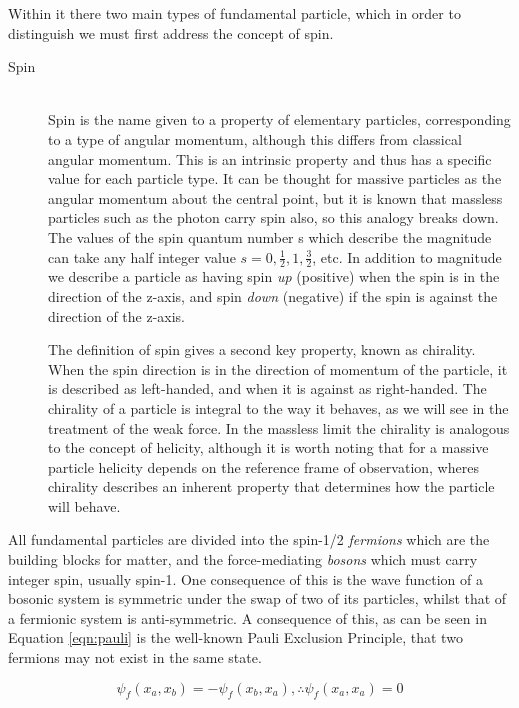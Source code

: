 Within it there two main types of fundamental particle, which in order to distinguish we must first address the concept of spin. 
\begin{description}
\item[Spin] \hfill \\
Spin is the name given to a property of elementary particles, corresponding to a type of angular momentum, although this differs from classical angular momentum. This is an intrinsic property and thus has a specific value for each particle type. It can be thought for massive particles as the angular momentum about the central point, but it is known that massless particles such as the photon carry spin also, so this analogy breaks down. The values of the spin quantum number s which describe the magnitude can take any half integer value $s=0, \frac{1}{2}, 1, \frac{3}{2}$, etc. In addition to magnitude we describe a particle as having spin \textit{up} (positive) when the spin is in the direction of the z-axis, and spin \textit{down} (negative) if the spin is against the direction of the z-axis. 

The definition of spin gives a second key property, known as chirality. When the spin direction is in the direction of momentum of the particle, it is described as left-handed, and when it is against as right-handed. The chirality of a particle is integral to the way it behaves, as we will see in the treatment of the weak force. In the massless limit  the chirality is analogous to the concept of helicity, although it is worth noting that for a massive particle helicity depends on the reference frame of observation, wheres chirality describes an inherent property that determines how the particle will behave.
\end{description}
All fundamental particles are divided into the spin-1/2 \textit{fermions} which are the building blocks for matter, and the force-mediating \textit{bosons} which must carry integer spin, usually spin-1. One consequence of this is the wave function of a bosonic system is symmetric under the swap of two of its particles, whilst that of a fermionic system is anti-symmetric. A consequence of this, as can be seen in Equation \ref{eqn:pauli} is the well-known Pauli Exclusion Principle, that two fermions may not exist in the same state. 

\begin{equation}
\psi_{f}(x_{a},x_{b}) = -\psi_{f}(x_{b},x_{a}),  \therefore \psi_{f}(x_{a},x_{a}) = 0
\label{eqn:pauli}
\end{equation}
 

